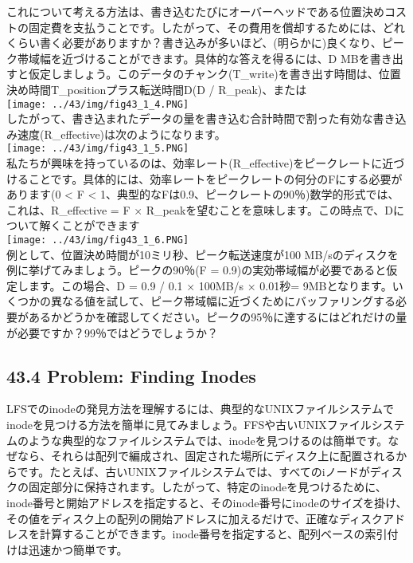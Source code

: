 これについて考える方法は、書き込むたびにオーバーヘッドである位置決めコストの固定費を支払うことです。したがって、その費用を償却するためには、どれくらい書く必要がありますか？書き込みが多いほど、(明らかに)良くなり、ピーク帯域幅を近づけることができます。具体的な答えを得るには、D
MBを書き出すと仮定しましょう。このデータのチャンク(T\_write)を書き出す時間は、位置決め時間T\_positionプラス転送時間D(D
/ R\_peak)、または\\
\texttt{[image: ../43/img/fig43\_1\_4.PNG]}\\
したがって、書き込まれたデータの量を書き込む合計時間で割った有効な書き込み速度(R\_effective)は次のようになります。\\
\texttt{[image: ../43/img/fig43\_1\_5.PNG]}\\
私たちが興味を持っているのは、効率レート(R\_effective)をピークレートに近づけることです。具体的には、効率レートをピークレートの何分のFにする必要があります(0
\textless{} F \textless{}
1、典型的なFは0.9、ピークレートの90％)数学的形式では、これは、R\_effective
= F ×
R\_peakを望むことを意味します。この時点で、Dについて解くことができます\\
\texttt{[image: ../43/img/fig43\_1\_6.PNG]}\\
例として、位置決め時間が10ミリ秒、ピーク転送速度が100
MB/sのディスクを例に挙げてみましょう。ピークの90％(F =
0.9)の実効帯域幅が必要であると仮定します。この場合、D = 0.9 / 0.1 ×
100MB/s × 0.01秒=
9MBとなります。いくつかの異なる値を試して、ピーク帯域幅に近づくためにバッファリングする必要があるかどうかを確認してください。ピークの95％に達するにはどれだけの量が必要ですか？99％ではどうでしょうか？

\hypertarget{problem-finding-inodes}{%
\subsection*{43.4 Problem: Finding Inodes}\label{problem-finding-inodes}}

LFSでのinodeの発見方法を理解するには、典型的なUNIXファイルシステムでinodeを見つける方法を簡単に見てみましょう。FFSや古いUNIXファイルシステムのような典型的なファイルシステムでは、inodeを見つけるのは簡単です。なぜなら、それらは配列で編成され、固定された場所にディスク上に配置されるからです。たとえば、古いUNIXファイルシステムでは、すべてのiノードがディスクの固定部分に保持されます。したがって、特定のinodeを見つけるために、inode番号と開始アドレスを指定すると、そのinode番号にinodeのサイズを掛け、その値をディスク上の配列の開始アドレスに加えるだけで、正確なディスクアドレスを計算することができます。inode番号を指定すると、配列ベースの索引付けは迅速かつ簡単です。

